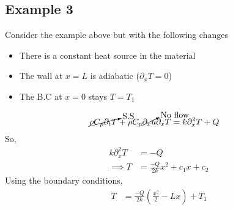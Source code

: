\subsection*{Example 3}
Consider the example above but with the following changes
\begin{itemize}
    \item There is a constant heat source in the material
    \item The wall at $x = L$ is adiabatic ($\partial_x T = 0$) 
    \item The B.C at $x= 0 $ stays $T = T_1$
\end{itemize}   
\begin{align*}
    \cancelto{\text{S.S}}{\rho C_p \partial_t T} + \rho C_p \cancelto{\text{No flow}}{\partial_x u} \partial_x T &= k \partial_x^2 T + Q
\end{align*}
So,
\begin{align*}
    k \partial_x^2 T &= -Q \\
    \implies T &= \frac{-Q}{2k}x^2 + c_1 x + c_2
\end{align*}
Using the boundary conditions,
\begin{align*}
    T &= \frac{-Q}{2k}\left(\frac{x^2}{2} - Lx\right) + T_1
\end{align*}